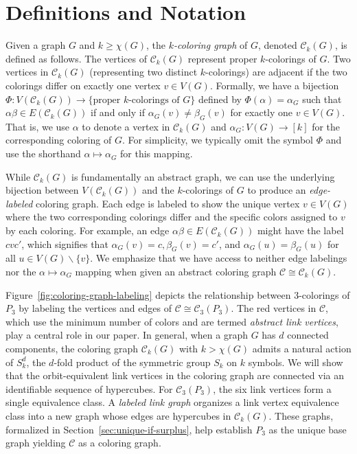 \documentclass{amsart}
\theoremstyle{hypothesisstyle}
\newcommand{\set}[1]{\{#1\}}
\theoremstyle{definition}
\theoremstyle{remark}
\numberwithin{equation}{section}
\newcommand{\C}{\mathcal C}
\begin{document}
\section{Definitions and Notation}\label{sec:def}

Given a graph $G$ and $k\geq \chi(G)$, the \emph{$k$-coloring graph} of $G$, denoted $\C_k(G)$, is defined as follows. The vertices of $\C_k(G)$ represent proper $k$-colorings of $G$. Two vertices in $\C_k(G)$ (representing two distinct $k$-colorings) are adjacent if the two colorings differ on exactly one vertex $v\in V(G)$. Formally, we have a bijection $\Phi\colon V(\mathcal{C}_k(G))\to  \{\text{proper } k\text{-colorings of } G \}$ defined by $\Phi(\alpha)=\alpha_{G}$ such that $\alpha\beta\in E(\mathcal{C}_k(G))$ if and only if $\alpha_G(v)\neq \beta_G(v)$ for exactly one $v\in V(G)$. That is, we use $\alpha$ to denote a vertex in $\mathcal{C}_k(G)$ and $\alpha_G\colon V(G)\to [k]$ for the corresponding coloring of $G$. For simplicity, we typically omit the symbol $\Phi$ and use the shorthand $\alpha\mapsto \alpha_G$ for this mapping. 

While $\C_k(G)$ is fundamentally an abstract graph, we can use the underlying bijection between $V(\C_k(G))$ and the $k$-colorings of $G$ to produce an {\em edge-labeled} coloring graph. Each edge is labeled to show the unique vertex $v\in V(G)$ where the two corresponding colorings differ and the specific colors assigned to $v$ by each coloring. For example, an edge $\alpha\beta\in E(\C_k(G))$ might have the label $cvc'$, which signifies that $\alpha_G(v)=c, \beta_G(v)=c'$, and $\alpha_G(u)=\beta_G(u)$ for all $u\in V(G)\backslash\set{v}$. We emphasize that we have access to neither edge labelings nor the $\alpha\mapsto\alpha_G$ mapping when given an abstract coloring graph $\mathcal{C}\cong \mathcal{C}_{k}(G)$.

 Figure~\ref{fig:coloring-graph-labeling} depicts the relationship between $3$-colorings of $P_3$ by labeling the vertices and edges of $\C\cong\C_3(P_3)$. The red vertices in $\mathcal{C}$, which use the minimum number of colors and are termed \emph{abstract link vertices}, play a central role in our paper. In general, when a graph $G$ has $d$ connected components, the coloring graph $\C_k(G)$ with $k>\chi(G)$ admits a natural action of $S_k^d$, the $d$-fold product of the symmetric group $S_k$ on $k$ symbols. %
 We will show that the orbit-equivalent link vertices in the coloring graph are connected via an identifiable sequence of hypercubes. For $\mathcal{C}_3(P_3)$, the six link vertices form a single equivalence class. A \emph{labeled link graph} organizes a link vertex equivalence class into a new graph whose edges are hypercubes in $\mathcal{C}_k(G)$. These graphs, formalized in Section~\ref{sec:unique-if-surplus}, help establish $P_3$ as the unique base graph yielding $\mathcal{C}$ as a coloring graph.
\end{document}

